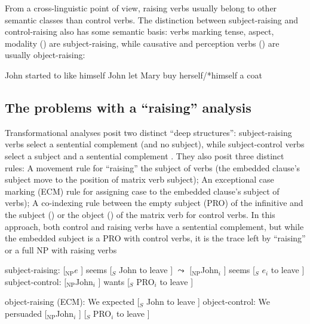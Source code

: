 \documentclass[output=paper]{langsci/langscibook}
\begin{document}
	From a cross-linguistic point of view, raising verbs usually belong to other semantic classes than control verbs. The distinction between subject-raising and control-raising also has some semantic basis: verbs marking tense, aspect, modality () are subject-raising, while
causative and perception verbs () are usually object-raising:

	\begin{exe}
\ex  \begin{xlist}
\ex John started to like himself
\ex John let Mary buy herself/*himself a coat
	 \end{xlist}
	 \end{exe}
	
\subsection{The problems with a ``raising'' analysis}

Transformational analyses posit two distinct ``deep structures'': subject-raising verbs select a sentential complement (and no subject), while subject-control verbs select a subject and a sentential complement \citep{Postal1974, Chomsky1981}. They also
posit three distinct rules:  A movement rule for ``raising'' the subject of  verbs (the embedded clause's subject move to the position of matrix verb subject); An exceptional case marking (ECM) rule for assigning case to the embedded clause's subject of  verbs); A co-indexing rule between the empty subject (PRO) of the infinitive and the subject () or the object () of the matrix verb for control verbs.
In this approach, both control and raising verbs have a sentential complement, but while the embedded subject is a PRO with control verbs, it is the trace left by ``raising'' or a full NP with raising verbs
	
\begin{exe}
\ex  \begin{xlist}
\ex 	subject-raising: $[$$_{\text{NP}}$$e$ ] seems [$_{S}$ John to leave ] 
$\leadsto$  
$[$$_{\text{NP}}$John$_{i}$ ] seems [$_{S}$ $e_{i}$ to leave ]	
\ex subject-control:  
$[$$_{\text{NP}}$John$_{i}$ ] wants [$_{S}$ PRO$_{i}$ to leave ]	
 \end{xlist}
 \end{exe}

\begin{exe}
\ex  \begin{xlist}
\ex 	object-raising (ECM): We expected [$_{S}$ John to leave ] 	
\ex object-control: We persuaded  
$[$$_{\text{NP}}$John$_{i}$ ]  [$_{S}$ PRO$_{i}$ to leave ]	
 \end{xlist}
 \end{exe}
\end{document}
